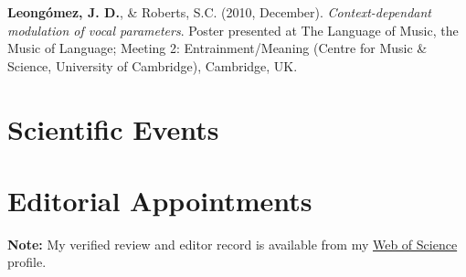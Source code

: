 \documentclass[11pt,a4paper,]{awesome-cv}
\begin{document}
\textbf{Leongómez, J. D.}, \& Roberts, S.C. (2010, December).
\emph{Context-dependant modulation of vocal parameters}. Poster
presented at The Language of Music, the Music of Language; Meeting 2:
Entrainment/Meaning (Centre for Music \& Science, University of
Cambridge), Cambridge, UK.

\endgroup

\hypertarget{scientific-events}{%
\section{Scientific Events}\label{scientific-events}}

\begin{cventries}
\end{cventries}

\hypertarget{editorial-appointments}{%
\section{Editorial Appointments}\label{editorial-appointments}}

\begin{small}
\textbf{Note:} My verified review and editor record is available from my \href{https://www.webofscience.com/wos/author/record/387716}{Web of Science} profile. 
\end{small}
\end{document}
